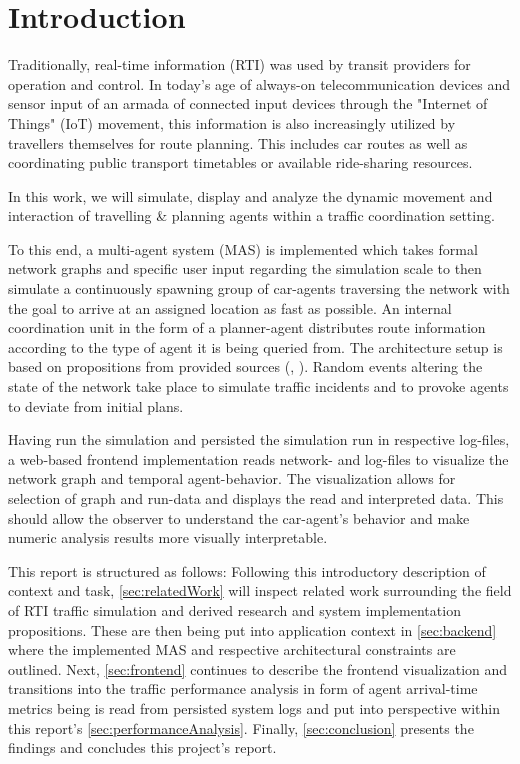 \section{Introduction}

Traditionally, real-time information (RTI) was used by transit providers for operation and control.
In today's age of always-on telecommunication devices and sensor input of an armada of connected input devices through the "Internet of Things" (IoT) movement, this information is also increasingly utilized by travellers themselves for route planning. This includes car routes as well as coordinating public transport timetables or available ride-sharing resources.

In this work, we will simulate, display and analyze the dynamic movement and interaction of travelling \& planning agents within a traffic coordination setting.

To this end, a multi-agent system (MAS) is implemented which takes formal network graphs and specific user input regarding the simulation scale to then simulate a continuously spawning group of car-agents traversing the network with the goal to arrive at an assigned location as fast as possible.
An internal coordination unit in the form of a planner-agent distributes route information according to the type of agent it is being queried from.
The architecture setup is based on propositions from provided sources (\cite{mastio2015towards}, \cite{brakewood2018literature}).
Random events altering the state of the network take place to simulate traffic incidents and to provoke agents to deviate from initial plans.

Having run the simulation and persisted the simulation run in respective log-files, a web-based frontend implementation reads network- and log-files to visualize the network graph and temporal agent-behavior. The visualization allows for selection of graph and run-data and displays the read and interpreted data.
This should allow the observer to understand the car-agent's behavior and make numeric analysis results more visually interpretable.

This report is structured as follows:
Following this introductory description of context and task, \autoref{sec:relatedWork} will inspect related work surrounding the field of RTI traffic simulation and derived research and system implementation propositions.
These are then being put into application context in \autoref{sec:backend} where the implemented MAS and respective architectural constraints are outlined.
Next, \autoref{sec:frontend} continues to describe the frontend visualization and transitions into the traffic performance analysis in form of agent arrival-time metrics being is read from persisted system logs and put into perspective within this report's \autoref{sec:performanceAnalysis}.
Finally, \autoref{sec:conclusion} presents the findings and concludes this project's report.    